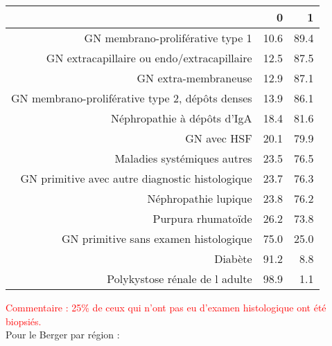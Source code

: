 \documentclass[11pt,a4paper]{article}\usepackage[]{graphicx}\usepackage[]{color}
\begin{document}
\begin{table}[H]
\centering
\begin{tabular}{rrr}
  \hline
 & 0 & 1 \\ 
  \hline
GN membrano-proliférative type 1 & 10.6 & 89.4 \\ 
  GN extracapillaire ou endo/extracapillaire & 12.5 & 87.5 \\ 
  GN extra-membraneuse & 12.9 & 87.1 \\ 
  GN membrano-proliférative type 2, dépôts denses & 13.9 & 86.1 \\ 
  Néphropathie à dépôts d'IgA & 18.4 & 81.6 \\ 
  GN avec HSF & 20.1 & 79.9 \\ 
  Maladies systémiques autres & 23.5 & 76.5 \\ 
  GN primitive avec autre diagnostic histologique & 23.7 & 76.3 \\ 
  Néphropathie lupique & 23.8 & 76.2 \\ 
  Purpura rhumatoïde & 26.2 & 73.8 \\ 
  GN primitive sans examen histologique & 75.0 & 25.0 \\ 
  Diabète & 91.2 & 8.8 \\ 
  Polykystose rénale de l adulte & 98.9 & 1.1 \\ 
   \hline
\end{tabular}
\end{table}


\textcolor{red}{Commentaire : 25\% de ceux qui n'ont pas eu d'examen histologique ont été biopsiés.}
~\\

Pour le Berger par région :
\end{document}
